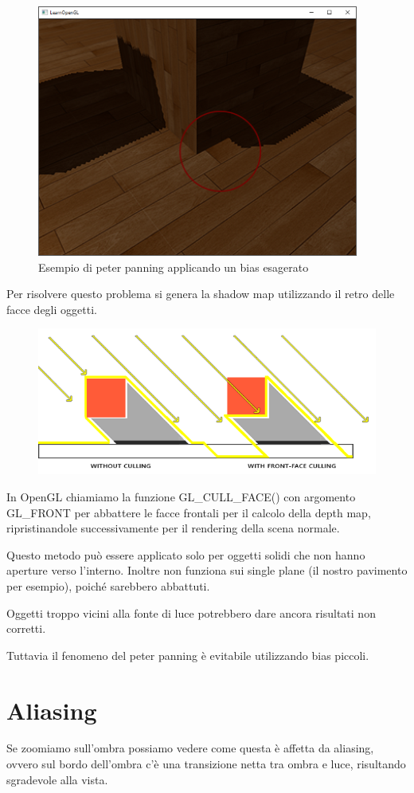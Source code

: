 \documentclass[12pt]{report}
\begin{document}
\begin{figure}[H]
    \centering
    \includegraphics[width=0.5\linewidth]{img/shadow_mapping_peter_panning.png}
    \caption{Esempio di peter panning applicando un bias esagerato}
\end{figure}

Per risolvere questo problema si genera la shadow map utilizzando il retro delle facce degli oggetti.

\begin{figure}[H]
    \centering
    \includegraphics[width=1.0\linewidth]{img/shadow_mapping_culling.png}
\end{figure}

In OpenGL chiamiamo la funzione GL\_CULL\_FACE() con argomento GL\_FRONT per abbattere le facce frontali per il calcolo della depth map, ripristinandole successivamente per il rendering della scena normale.

Questo metodo può essere applicato solo per oggetti solidi che non hanno aperture verso l'interno. Inoltre non funziona sui single plane (il nostro pavimento per esempio), poiché sarebbero abbattuti. 

Oggetti troppo vicini alla fonte di luce potrebbero dare ancora risultati non corretti.

Tuttavia il fenomeno del peter panning è evitabile utilizzando bias piccoli.

\section{Aliasing}
Se zoomiamo sull'ombra possiamo vedere come questa è affetta da aliasing, ovvero sul bordo dell'ombra c'è una transizione netta tra ombra e luce, risultando sgradevole alla vista.
\end{document}
